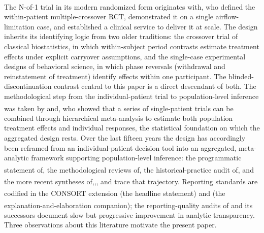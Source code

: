 \documentclass[
  11pt,
]{article}
\begin{document}
The N-of-1 trial in its modern randomized form originates with\textsuperscript{},
who defined the within-patient multiple-crossover RCT, demonstrated it on a
single airflow-limitation case, and established a clinical service to deliver
it at scale. The design inherits its identifying logic from two older
traditions: the crossover trial of classical biostatistics, in which
within-subject period contrasts estimate treatment effects under explicit
carryover assumptions, and the single-case experimental designs of behavioral
science, in which phase reversals (withdrawal and reinstatement of treatment)
identify effects within one participant. The blinded-discontinuation contrast
central to this paper is a direct descendant of both. The methodological step
from the individual-patient trial to population-level inference was taken by\textsuperscript{} and\textsuperscript{}, who showed that a series of single-patient trials
can be combined through hierarchical meta-analysis to estimate both population
treatment effects and individual responses, the statistical foundation on
which the aggregated design rests. Over the last fifteen years the design has
accordingly been reframed from an individual-patient decision tool into an
aggregated, meta-analytic framework supporting population-level inference: the
programmatic statement of\textsuperscript{}, the methodological reviews of\textsuperscript{}, the historical-practice audit of\textsuperscript{}, and the more recent
syntheses of\textsuperscript{},\textsuperscript{},\textsuperscript{}, and\textsuperscript{} trace that trajectory. Reporting
standards are codified in the CONSORT extension\textsuperscript{} (the headline statement) and\textsuperscript{} (the explanation-and-elaboration companion); the
reporting-quality audits of\textsuperscript{} and its successors document slow but
progressive improvement in analytic transparency. Three observations about
this literature motivate the present paper.
\end{document}
